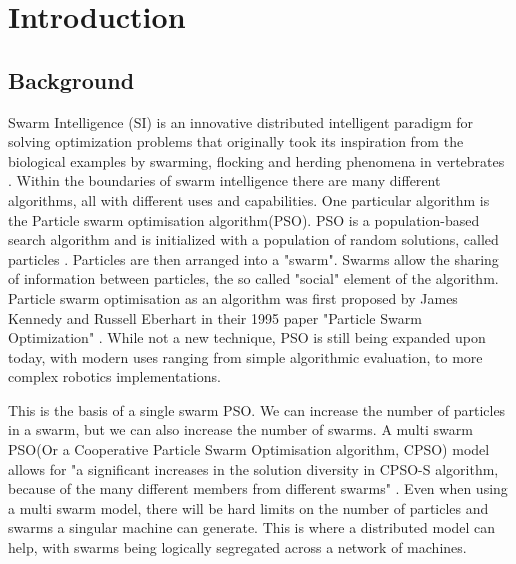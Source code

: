 \documentclass[oneside,12pt]{book}
\begin{document}
\newpage

\fancyhead[RE,LO]{\leftmark}
\renewcommand{\headrulewidth}{2pt}



\chapter{Introduction}
\section{Background}
\par Swarm Intelligence (SI) is an innovative distributed intelligent paradigm for solving optimization problems that originally took its inspiration from the biological examples by swarming, flocking and herding phenomena in vertebrates \cite{abraham_guo_liu_2006}.
Within the boundaries of swarm intelligence there are many different algorithms, all with different uses and capabilities. One particular algorithm is the Particle swarm optimisation algorithm(PSO). PSO is a population-based search algorithm and is initialized with a population of random solutions, called particles \cite{shi_2004}. Particles are then arranged into a "swarm". Swarms allow the sharing of information between particles, the so called "social" element of the algorithm. Particle swarm optimisation as an algorithm was first proposed by James Kennedy  and Russell Eberhart in their 1995 paper "Particle Swarm Optimization" \cite{kennedy_eberhart_1995}. While not a new technique, PSO is still being expanded upon today, with modern uses ranging from simple algorithmic evaluation, to more complex robotics implementations. 

This is the basis of a single swarm PSO. We can increase the number of particles in a swarm, but we can also increase the number of swarms. A multi swarm PSO(Or a Cooperative Particle Swarm Optimisation algorithm, CPSO) model allows for "a significant increases in the solution diversity in CPSO-S algorithm, because of the many different members from different swarms" \cite{vandenbergh_engelbrecht_2004}. Even when using a multi swarm model, there will be hard limits on the number of particles and swarms a singular machine can generate. This is where a distributed model can help, with swarms being logically segregated across a network of machines.
\end{document}
